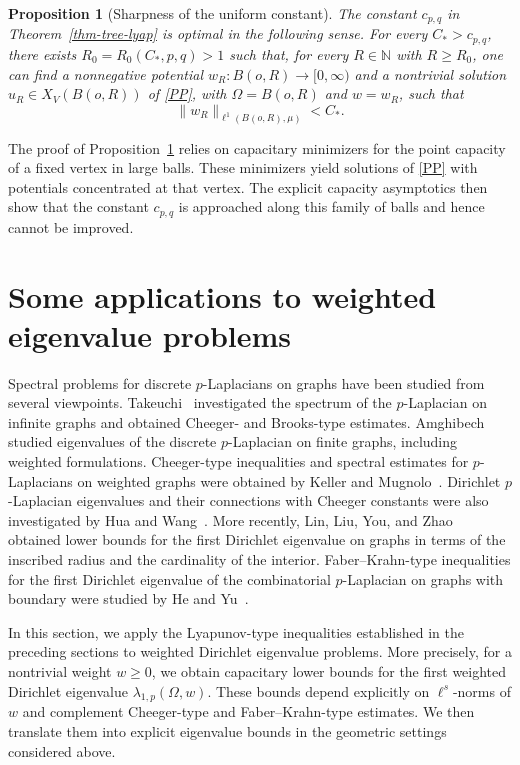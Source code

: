 \documentclass[twoside,12pt,letter]{article}
\theoremstyle{plain}
\newtheorem{proposition}[theorem]{Proposition}
\theoremstyle{definition}
\theoremstyle{remark}
\numberwithin{equation}{section}
\begin{document}
\begin{proposition}[Sharpness of the uniform constant]
\label{prop-tree-sharp}
The constant \(c_{p,q}\) in Theorem~\ref{thm-tree-lyap} is optimal in the
following sense. For every \(C_*>c_{p,q}\), there exists
\(R_0=R_0(C_*,p,q)>1\) such that, for every \(R\in\mathbb{N}\) with
\(R\ge R_0\), one can find a nonnegative potential
\(w_R:B(o,R)\to[0,\infty)\) and a nontrivial solution
\(u_R\in X_V(B(o,R))\) of \eqref{PP}, with \(\Omega=B(o,R)\) and \(w=w_R\),
such that
\[
\|w_R\|_{\ell^1(B(o,R),\mu)}<C_*.
\]
\end{proposition}

The proof of Proposition~\ref{prop-tree-sharp} relies on capacitary minimizers
for the point capacity of a fixed vertex in large balls. These minimizers yield
solutions of \eqref{PP} with potentials concentrated at that vertex. The
explicit capacity asymptotics then show that the constant \(c_{p,q}\) is
approached along this family of balls and hence cannot be improved.

\section{Some applications to weighted eigenvalue problems}\label{sec4}

Spectral problems for discrete \(p\)-Laplacians on graphs have been studied
from several viewpoints. Takeuchi~\cite{Takeuchi2003} investigated the
spectrum of the \(p\)-Laplacian on infinite graphs and obtained Cheeger- and
Brooks-type estimates. Amghibech~\cite{Amghibech2003} studied eigenvalues of
the discrete \(p\)-Laplacian on finite graphs, including weighted
formulations. Cheeger-type inequalities and spectral estimates for
\(p\)-Laplacians on weighted graphs were obtained by Keller and
Mugnolo~\cite{KellerMugnolo2016}. Dirichlet \(p\)-Laplacian eigenvalues and
their connections with Cheeger constants were also investigated by Hua and
Wang~\cite{HuaWang2020}. More recently, Lin, Liu, You, and
Zhao~\cite{LinLiuYouZhao2025} obtained lower bounds for the first Dirichlet
eigenvalue on graphs in terms of the inscribed radius and the cardinality of
the interior. Faber--Krahn-type inequalities for the first Dirichlet eigenvalue
of the combinatorial \(p\)-Laplacian on graphs with boundary were studied by
He and Yu~\cite{HeYu2026}.

In this section, we apply the Lyapunov-type inequalities established in the
preceding sections to weighted Dirichlet eigenvalue problems. More precisely,
for a nontrivial weight \(w\ge 0\), we obtain capacitary lower bounds for the
first weighted Dirichlet eigenvalue \(\lambda_{1,p}(\Omega,w)\). These bounds
depend explicitly on \(\ell^s\)-norms of \(w\) and complement Cheeger-type and
Faber--Krahn-type estimates. We then translate them into explicit eigenvalue
bounds in the geometric settings considered above.
\end{document}
